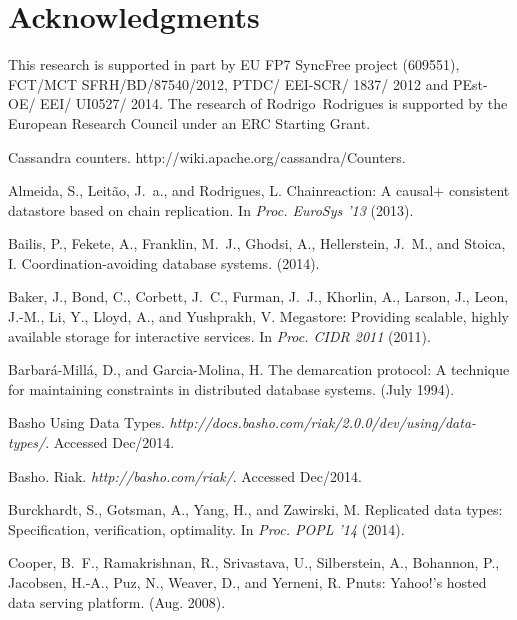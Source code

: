 \documentclass[conference]{IEEEtran}
\newcommand{\url}[1]{\emph{#1}}
\begin{document}
\section*{Acknowledgments}

This research is supported in part 
    by EU FP7 SyncFree project (609551),
FCT/MCT SFRH/BD/87540/2012, PTDC/ EEI-SCR/ 1837/ 2012 and PEst-OE/ EEI/ UI0527/ 2014. The research of Rodrigo\ Rodrigues is supported by the European Research Council under an ERC Starting Grant.


{

\begin{thebibliography}{10}

Cassandra counters.
\newblock http://wiki.apache.org/cassandra/Counters.

{\sc Almeida, S., Leit\~{a}o, J.~a., and Rodrigues, L.}
\newblock Chainreaction: A causal+ consistent datastore based on chain
  replication.
\newblock In {\em Proc. EuroSys '13} (2013).

{\sc Bailis, P., Fekete, A., Franklin, M.~J., Ghodsi, A., Hellerstein, J.~M.,
  and Stoica, I.}
\newblock Coordination-avoiding database systems.
 (2014).

{\sc Baker, J., Bond, C., Corbett, J.~C., Furman, J.~J., Khorlin, A., Larson,
  J., Leon, J.-M., Li, Y., Lloyd, A., and Yushprakh, V.}
\newblock Megastore: Providing scalable, highly available storage for
  interactive services.
\newblock In {\em Proc. CIDR 2011} (2011).

{\sc Barbar\'{a}-Mill\'{a}, D., and Garcia-Molina, H.}
\newblock The demarcation protocol: A technique for maintaining constraints in
  distributed database systems.
 (July 1994).

{\sc Basho}
\newblock Using Data Types.
\newblock \url{http://docs.basho.com/riak/2.0.0/dev/using/data-types/}.
\newblock Accessed Dec/2014.

{\sc Basho}.
\newblock Riak.
\newblock \url{http://basho.com/riak/}.
\newblock Accessed Dec/2014.

{\sc Burckhardt, S., Gotsman, A., Yang, H., and Zawirski, M.}
\newblock Replicated data types: Specification, verification, optimality.
\newblock In {\em Proc. POPL '14} (2014).

{\sc Cooper, B.~F., Ramakrishnan, R., Srivastava, U., Silberstein, A.,
  Bohannon, P., Jacobsen, H.-A., Puz, N., Weaver, D., and Yerneni, R.}
\newblock Pnuts: Yahoo!'s hosted data serving platform.
 (Aug. 2008).


\end{thebibliography}}
\end{document}
